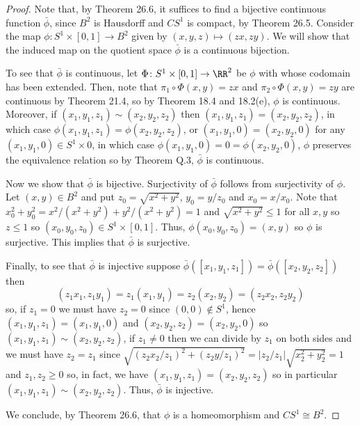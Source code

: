 \begin{proof}
Note that, by Theorem 26.6, it suffices to find a bijective
continuous function $\bar\phi$, since $B^2$ is Hausdorff and $CS^1$ is
compact, by Theorem 26.5. Consider the map $\phi\colon
S^1\times[0,1]\to B^2$ given by $(x,y,z)\mapsto (zx,zy)$. We will show
that the induced map on the quotient space $\bar\phi$ is a continuous
bijection.

To see that $\bar\phi$ is continuous, let $\Phi\colon
S^1\times[0,1]\to\RR^2$ be $\phi$ with whose codomain has been
extended. Then, note that $\pi_1\circ\Phi(x,y)=zx$ and
$\pi_2\circ\Phi(x,y)=zy$ are continuous by Theorem 21.4, so by Theorem
18.4 and 18.2(e), $\phi$ is continuous. Moreover, if
$(x_1,y_1,z_1)\sim(x_2,y_2,z_2)$ then $(x_1,y_1,z_1)=(x_2,y_2,z_2)$,
in which case $\phi(x_1,y_1,z_1)=\phi(x_2,y_2,z_2)$, or
$(x_1,y_1,0)=(x_2,y_2,0)$ for any $(x_1,y_1,0)\in S^1\times 0$, in
which case $\phi(x_1,y_1,0)=0=\phi(x_2,y_2,0)$, $\phi$ preserves the
equivalence relation so by Theorem Q.3, $\bar\phi$ is continuous.

Now we show that $\bar\phi$ is bijective. Surjectivity of $\bar\phi$
follows from surjectivity of $\phi$. Let $(x,y)\in B^2$ and put
$z_0=\sqrt{x^2+y^2}$, $y_0=y/z_0$ and $x_0=x/x_0$. Note that
$x_0^2+y_0^2=x^2/(x^2+y^2)+y^2/(x^2+y^2)=1$ and $\sqrt{x^2+y^2}\leq 1$
for all $x,y$ so $z\leq 1$ so $(x_0,y_0,z_0)\in S^1\times[0,1]$. Thus,
$\phi(x_0,y_0,z_0)=(x,y)$ so $\phi$ is surjective. This implies that
$\bar\phi$ is surjective.

Finally, to see that $\bar\phi$ is injective suppose
$\bar\phi([x_1,y_1,z_1])=\bar\phi([x_2,y_2,z_2])$ then
\[
\tag{(*)}
(z_1x_1,z_1y_1)=z_1(x_1,y_1)=z_2(x_2,y_2)=(z_2x_2,z_2y_2)
\]
so, if $z_1=0$ we must have $z_2=0$ since $(0,0)\notin S^1$, hence
$(x_1,y_1,z_1)=(x_1,y_1,0)$ and $(x_2,y_2,z_2)=(x_2,y_2,0)$ so
$(x_1,y_1,z_1)\sim(x_2,y_2,z_2)$, if $z_1\neq 0$ then we can divide by
$z_1$ on both sides and we must have $z_2=z_1$ since
$\sqrt{(z_2x_2/z_1)^2+(z_2y/z_1)^2}=|z_2/z_1|\sqrt{x_2^2+y_2^2}=1$ and
$z_1,z_2\geq 0$ so, in fact, we have $(x_1,y_1,z_1)=(x_2,y_2,z_2)$ so
in particular $(x_1,y_1,z_1)\sim(x_2,y_2,z_2)$. Thus, $\bar\phi$ is
injective.

We conclude, by Theorem 26.6, that $\phi$ is a homeomorphism and
$CS^1\cong B^2$.
\end{proof}

